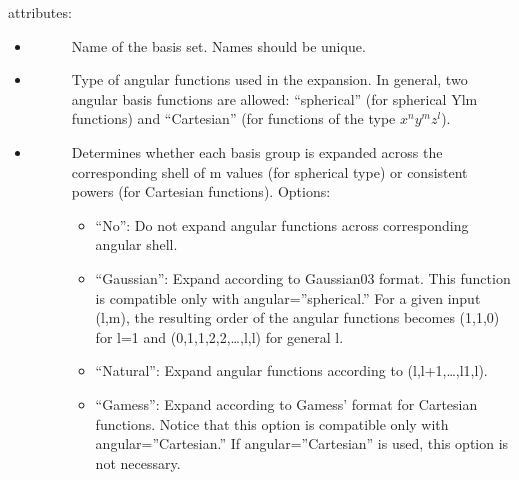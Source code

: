 \documentclass[letterpaper,10pt,english]{sphinxmanual}
\begin{document}
 attributes:
\begin{itemize}
\item {} \begin{description}
\item[{}] \leavevmode
Name of the basis set. Names should be unique.

\end{description}

\item {} \begin{description}
\item[{}] \leavevmode
Type of angular functions used in the expansion. In general, two angular basis functions are allowed: “spherical” (for spherical Ylm functions) and “Cartesian” (for functions of the type \(x^{n}y^{m}z^{l}\)).

\end{description}

\item {} \begin{description}
\item[{}] \leavevmode
Determines whether each basis group is expanded across the corresponding shell of m values (for spherical type) or consistent powers (for Cartesian functions). Options:
\begin{itemize}
\item {} 
“No”: Do not expand angular functions across corresponding angular shell.

\item {} 
“Gaussian”: Expand according to Gaussian03 format. This function is compatible only with angular=”spherical.” For a given input (l,m), the resulting order of the angular functions becomes (1,\sphinxhyphen{}1,0) for l=1 and (0,1,\sphinxhyphen{}1,2,\sphinxhyphen{}2,…,l,\sphinxhyphen{}l) for general l.

\item {} 
“Natural”: Expand angular functions according to (\sphinxhyphen{}l,\sphinxhyphen{}l+1,…,l\sphinxhyphen{}1,l).

\item {} 
“Gamess”: Expand according to Gamess’ format for Cartesian functions. Notice that this option is compatible only with angular=”Cartesian.” If angular=”Cartesian” is used, this option is not necessary.

\end{itemize}


\end{description}
\end{itemize}
\end{document}
